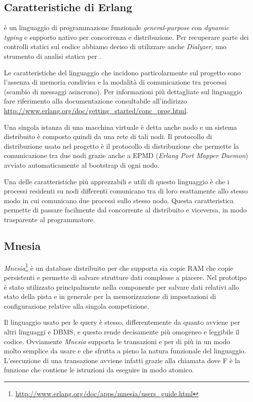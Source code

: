 \subsection*{Caratteristiche di Erlang}
\Erlang{} è un linguaggio di programmazione funzionale \textit{general-purpose} con \textit{dynamic typing} e supporto nativo per concorrenza e distribuzione. Per recuperare parte dei controlli statici sul codice abbiamo deciso di utilizzare anche \textsl{Dialyzer}, uno strumento di analisi statica per \Erlang{}.

Le caratteristiche del linguaggio che incidono particolarmente sul progetto sono l'assenza di memoria condivisa e la modalità di comunicazione tra processi (scambio di messaggi asincrono).
Per informazioni più dettagliate sul linguaggio fare riferimento alla documentazione consultabile all'indirizzo \url{http://www.erlang.org/doc/getting_started/conc_prog.html}.

Una singola istanza di una macchina virtuale \Erlang{} è detta anche nodo \Erlang{} e un sistema \Erlang{} distribuito è composto quindi da una rete di tali nodi. Il protocollo di distribuzione usato nel progetto è il protocollo di distribuzione \Erlang{} che permette la comunicazione tra due nodi \Erlang{} grazie anche a EPMD (\textsl{Erlang Port Mapper Daemon}) avviato automaticamente al bootstrap di ogni nodo.

Una delle caratteristiche più apprezzabili e utili di questo linguaggio è che i processi residenti su nodi differenti comunicano tra di loro esattamente allo stesso modo in cui comunicano due processi sullo stesso nodo. Questa caratteristica permette di passare facilmente dal concorrente al distribuito e viceversa, in modo trasparente al programmatore.

\subsection*{Mnesia}
\textsl{Mnesia}\footnote{\url{http://www.erlang.org/doc/apps/mnesia/users_guide.html}} è un database distribuito per \Erlang{} che supporta sia copie RAM che copie persistenti e permette di salvare strutture dati complesse a piacere. Nel prototipo è stato utilizzato principalmente nella componente \track{} per salvare dati relativi allo stato della pista e in generale per la memorizzazione di impostazioni di configurazione relative alla singola competizione.

Il linguaggio usato per le query è \Erlang{} stesso, differentemente da quanto avviene per altri linguaggi e DBMS, e questo rende decisamente più omogeneo e leggibile il codice. Ovviamente \textsl{Mnesia} supporta le transazioni e per di più in un modo molto semplice da usare e che sfrutta a pieno la natura funzionale del linguaggio. L'esecuzione di una transazione avviene infatti grazie alla chiamata  dove F è la funzione che contiene le istruzioni da eseguire in modo atomico.

